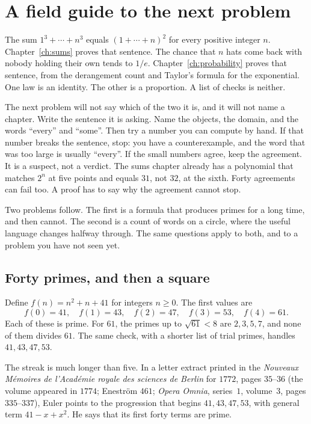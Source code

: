 \chapter*{A field guide to the next problem}
The sum $1^3+\cdots+n^3$ equals $(1+\cdots+n)^2$ for every positive integer $n$. Chapter~\ref{ch:sums} proves that sentence. The chance that $n$ hats come back with nobody holding their own tends to $1/e$. Chapter~\ref{ch:probability} proves that sentence, from the derangement count and Taylor's formula for the exponential. One law is an identity. The other is a proportion. A list of checks is neither.

The next problem will not say which of the two it is, and it will not name a chapter. Write the sentence it is asking. Name the objects, the domain, and the words ``every'' and ``some''. Then try a number you can compute by hand. If that number breaks the sentence, stop: you have a counterexample, and the word that was too large is usually ``every''. If the small numbers agree, keep the agreement. It is a suspect, not a verdict. The sums chapter already has a polynomial that matches $2^n$ at five points and equals $31$, not $32$, at the sixth. Forty agreements can fail too. A proof has to say why the agreement cannot stop.

Two problems follow. The first is a formula that produces primes for a long time, and then cannot. The second is a count of words on a circle, where the useful language changes halfway through. The same questions apply to both, and to a problem you have not seen yet.

\section*{Forty primes, and then a square}
Define $f(n)=n^2+n+41$ for integers $n\ge0$. The first values are
\[
f(0)=41,\quad f(1)=43,\quad f(2)=47,\quad f(3)=53,\quad f(4)=61.
\]
Each of these is prime. For $61$, the primes up to $\sqrt{61}<8$ are $2,3,5,7$, and none of them divides $61$. The same check, with a shorter list of trial primes, handles $41,43,47,53$.

The streak is much longer than five. In a letter extract printed in the \emph{Nouveaux M\'emoires de l'Acad\'emie royale des sciences de Berlin} for $1772$, pages $35$--$36$ (the volume appeared in $1774$; Enestr\"om $461$; \emph{Opera Omnia}, series~$1$, volume~$3$, pages $335$--$337$), Euler points to the progression that begins $41,43,47,53$, with general term $41-x+x^2$. He says that its first forty terms are prime.

